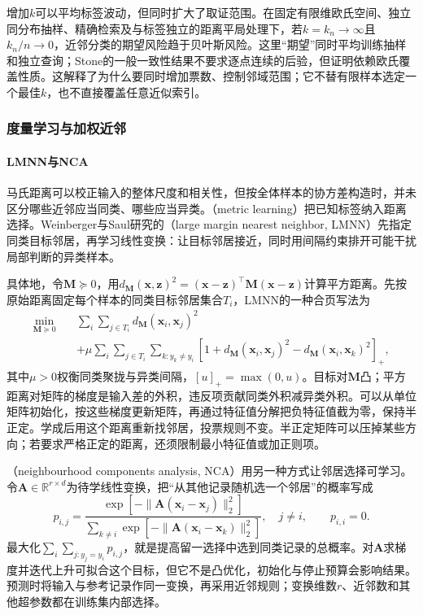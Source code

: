 增加$k$可以平均标签波动，但同时扩大了取证范围。在固定有限维欧氏空间、独立同分布抽样、精确检索及与标签独立的距离平局处理下，若$k=k_n\to\infty$且$k_n/n\to0$，近邻分类的期望风险趋于贝叶斯风险。这里“期望”同时平均训练抽样和独立查询；Stone的一般一致性结果不要求逐点连续的后验，但证明依赖欧氏覆盖性质。这解释了为什么要同时增加票数、控制邻域范围；它不替有限样本选定一个最佳$k$，也不直接覆盖任意近似索引。

\subsubsection{度量学习与加权近邻}

\paragraph{LMNN与NCA}
马氏距离可以校正输入的整体尺度和相关性，但按全体样本的协方差构造时，并未区分哪些近邻应当同类、哪些应当异类。（metric learning）把已知标签纳入距离选择。Weinberger与Saul研究的（large margin nearest neighbor, LMNN）先指定同类目标邻居，再学习线性变换：让目标邻居接近，同时用间隔约束排开可能干扰局部判断的异类样本。

具体地，令$\bm M\succeq0$，用$d_{\bm M}(\bm x,\bm z)^2=(\bm x-\bm z)^\top\bm M(\bm x-\bm z)$计算平方距离。先按原始距离固定每个样本的同类目标邻居集合$T_i$，LMNN的一种合页写法为
\[
  \begin{aligned}
    \min_{\bm M\succeq0}\quad&
      \sum_i\sum_{j\in T_i}d_{\bm M}(\bm x_i,\bm x_j)^2\\
      &+\mu\sum_i\sum_{j\in T_i}\sum_{k:y_k\ne y_i}
      [1+d_{\bm M}(\bm x_i,\bm x_j)^2-d_{\bm M}(\bm x_i,\bm x_k)^2]_+,
  \end{aligned}
\]
其中$\mu>0$权衡同类聚拢与异类间隔，$[u]_+=\max(0,u)$。目标对$\bm M$凸；平方距离对矩阵的梯度是输入差的外积，违反项贡献同类外积减异类外积。可以从单位矩阵初始化，按这些梯度更新矩阵，再通过特征值分解把负特征值截为零，保持半正定。学成后用这个距离重新找邻居，投票规则不变。半正定矩阵可以压掉某些方向；若要求严格正定的距离，还须限制最小特征值或加正则项。

（neighbourhood components analysis, NCA）用另一种方式让邻居选择可学习。令$\bm A\in\mathbb R^{r\times d}$为待学线性变换，把“从其他记录随机选一个邻居”的概率写成
\[
  p_{i,j}=\frac{\exp[-\|\bm A(\bm x_i-\bm x_j)\|_2^2]}
    {\sum_{k\ne i}\exp[-\|\bm A(\bm x_i-\bm x_k)\|_2^2]},
  \quad j\ne i,\qquad p_{i,i}=0.
\]
最大化$\sum_i\sum_{j:y_j=y_i}p_{i,j}$，就是提高留一选择中选到同类记录的总概率。对$\bm A$求梯度并迭代上升可拟合这个目标，但它不是凸优化，初始化与停止预算会影响结果。预测时将输入与参考记录作同一变换，再采用近邻规则；变换维数$r$、近邻数和其他超参数都在训练集内部选择。

